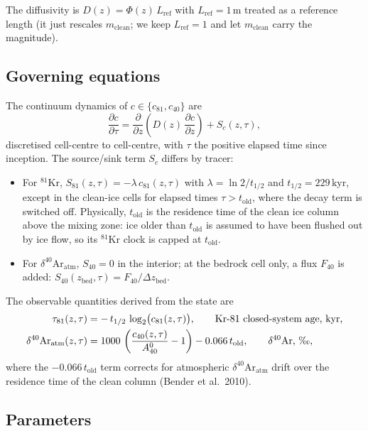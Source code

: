 \documentclass[11pt,a4paper]{article}
\newcommand{\Kr}{\ensuremath{{}^{81}\mathrm{Kr}}}
\newcommand{\Ar}{\ensuremath{\delta^{40}\mathrm{Ar}_{\mathrm{atm}}}}
\newcommand{\told}{\ensuremath{t_{\mathrm{old}}}}
\begin{document}
The diffusivity is $D(z) = \Phi(z)\,L_{\mathrm{ref}}$ with $L_{\mathrm{ref}}=1\,\mathrm{m}$
treated as a reference length (it just rescales $m_{\mathrm{clean}}$; we keep
$L_{\mathrm{ref}}=1$ and let $m_{\mathrm{clean}}$ carry the magnitude).

\subsection{Governing equations}

The continuum dynamics of $c\in\{c_{81}, c_{40}\}$ are
\begin{equation}
\frac{\partial c}{\partial \tau} = \frac{\partial}{\partial z}\!\left(D(z)\,\frac{\partial c}{\partial z}\right) + S_c(z, \tau),
\label{eq:pde}
\end{equation}
discretised cell-centre to cell-centre, with $\tau$ the positive elapsed time
since inception. The source/sink term $S_c$ differs by tracer:

\begin{itemize}
  \item For \Kr{}, $S_{81}(z, \tau) = -\lambda\, c_{81}(z, \tau)$ with
        $\lambda = \ln 2 / t_{1/2}$ and $t_{1/2}=229\,\mathrm{kyr}$, except in
        the clean-ice cells for elapsed times $\tau > \told$, where the decay
        term is switched off. Physically, $\told$ is the residence time of
        the clean ice column above the mixing zone: ice older than $\told$
        is assumed to have been flushed out by ice flow, so its \Kr{} clock
        is capped at $\told$.
  \item For \Ar{}, $S_{40} = 0$ in the interior; at the bedrock cell only,
        a flux $F_{40}$ is added: $S_{40}(z_{\mathrm{bed}}, \tau) =
        F_{40}/\Delta z_{\mathrm{bed}}$.
\end{itemize}

The observable quantities derived from the state are
\begin{align}
\tau_{81}(z, \tau) &= -\,t_{1/2}\,\log_2\!\big(c_{81}(z, \tau)\big),
 \qquad \text{Kr-81 closed-system age, kyr,} \\
\delta^{40}\mathrm{Ar}_{\mathrm{atm}}(z, \tau) &= 1000\,\left(\frac{c_{40}(z,\tau)}{A_{40}^{0}} - 1\right) - 0.066\,\told,
 \qquad \text{$\delta^{40}\mathrm{Ar}$, \textperthousand},
\end{align}
where the $-0.066\,\told$ term corrects for atmospheric \Ar{} drift over the
residence time of the clean column (Bender et al.\ 2010).

\subsection{Parameters}
\end{document}
